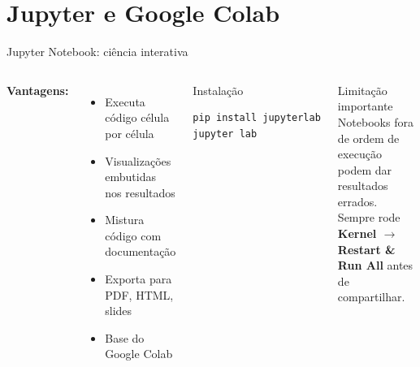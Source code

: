 \section{Jupyter e Google Colab}

\begin{frame}[fragile, shrink=15]{Jupyter Notebook: ciência interativa}

\vspace{0.3cm}

\begin{columns}
\textbf{Vantagens:}
\begin{itemize}
    \item Executa código célula por célula
    \item Visualizações embutidas nos resultados
    \item Mistura código com documentação
    \item Exporta para PDF, HTML, slides
    \item Base do Google Colab
\end{itemize}

\begin{exampleblock}{Instalação}
\begin{lstlisting}[language=bash, numbers=none, basicstyle=\ttfamily\small]
pip install jupyterlab
jupyter lab
\end{lstlisting}
\end{exampleblock}

\vspace{0.2cm}
\begin{alertblock}{Limitação importante}
Notebooks fora de ordem de execução podem dar resultados errados. Sempre rode \textbf{Kernel $\to$ Restart \& Run All} antes de compartilhar.
\end{alertblock}
\end{columns}
\end{frame}

